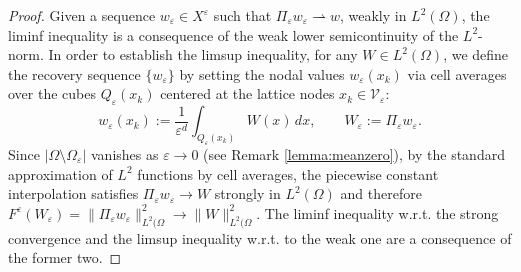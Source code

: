 \documentclass[a4paper,11pt]{article}
\theoremstyle{definition}
\numberwithin{equation}{section}
\newcommand{\e}{\varepsilon}
\newcommand{\V}{\mathcal{V}}
\begin{document}
\begin{proof} 
	Given a sequence $w_\e \in X^\e$ such that $\Pi_\e w_\e \rightharpoonup w$, weakly in $L^2(\Omega)$, the liminf inequality is a consequence of the weak lower semicontinuity of the $L^2$-norm. 
	In order to establish the limsup inequality, for any $W \in L^2(\Omega)$, we define the recovery sequence $\{w_\e\}$ by setting the nodal values $w_\e(x_k)$ via cell averages over the cubes $Q_\e(x_k)$ centered at the lattice nodes $x_k \in \V_\e$:
	\begin{equation*}
		w_\e(x_k) := \frac{1}{\e^d} \int_{Q_\e(x_k)} W(x) \, dx,\qquad W_\e:=\Pi_\e w_\e.
	\end{equation*}
	Since $|\Omega\setminus \Omega_\e|$ vanishes as $\e\to0$ (see Remark \ref{lemma:meanzero}), by the standard approximation of $L^2$ functions by cell averages, the piecewise constant interpolation satisfies $\Pi_\e w_\e \to W$ strongly in $L^2(\Omega)$ and therefore $F^\e(W_\e)=\|\Pi_\e w_\e\|_{L^2(\Omega}^2 \to \|W\|_{L^2(\Omega}^2$. The liminf inequality w.r.t. the strong convergence and the limsup inequality w.r.t. to the weak one are a consequence of the former two.
\end{proof}
\end{document}
